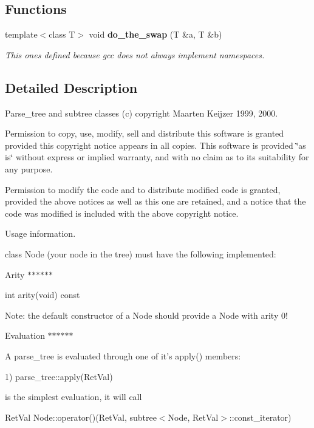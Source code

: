 \subsection*{Functions}
\begin{CompactItemize}
\item 
template$<$class T$>$ void {\bf do\_\-the\_\-swap} (T \&a, T \&b)\label{namespacegp__parse__tree_a0}

\begin{CompactList}\small\item\em This ones defined because gcc does not always implement namespaces. \item\end{CompactList}\end{CompactItemize}


\subsection{Detailed Description}
Parse\_\-tree and subtree classes (c) copyright Maarten Keijzer 1999, 2000. 

Permission to copy, use, modify, sell and distribute this software is granted provided this copyright notice appears in all copies. This software is provided \char`\"{}as is\char`\"{} without express or implied warranty, and with no claim as to its suitability for any purpose.

Permission to modify the code and to distribute modified code is granted, provided the above notices as well as this one are retained, and a notice that the code was modified is included with the above copyright notice.

Usage information.

class Node (your node in the tree) must have the following implemented:

Arity $\ast$$\ast$$\ast$$\ast$$\ast$$\ast$

int arity(void) const

Note: the default constructor of a Node should provide a Node with arity 0!

Evaluation $\ast$$\ast$$\ast$$\ast$$\ast$$\ast$

A parse\_\-tree is evaluated through one of it's apply() members:

1) parse\_\-tree::apply(Ret\-Val)

is the simplest evaluation, it will call

Ret\-Val Node::operator()(Ret\-Val, subtree$<$Node, Ret\-Val$>$::const\_\-iterator)

